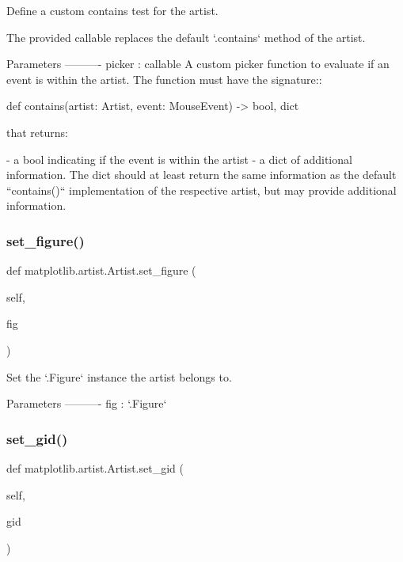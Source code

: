 \begin{DoxyVerb}Define a custom contains test for the artist.

The provided callable replaces the default `.contains` method
of the artist.

Parameters
----------
picker : callable
    A custom picker function to evaluate if an event is within the
    artist. The function must have the signature::

def contains(artist: Artist, event: MouseEvent) -> bool, dict

    that returns:

    - a bool indicating if the event is within the artist
    - a dict of additional information. The dict should at least
      return the same information as the default ``contains()``
      implementation of the respective artist, but may provide
      additional information.
\end{DoxyVerb}
 \mbox{\label{classmatplotlib_1_1artist_1_1Artist_aadfe4032643c1684c4091a2fbca2f02b}} 
\subsubsection{\texorpdfstring{set\+\_\+figure()}{set\_figure()}}
{\footnotesize\ttfamily def matplotlib.\+artist.\+Artist.\+set\+\_\+figure (\begin{DoxyParamCaption}\item[{}]{self,  }\item[{}]{fig }\end{DoxyParamCaption})}

\begin{DoxyVerb}Set the `.Figure` instance the artist belongs to.

Parameters
----------
fig : `.Figure`
\end{DoxyVerb}
 \mbox{\label{classmatplotlib_1_1artist_1_1Artist_aa9f9956c2e5ed3fb357779b7cd66898f}} 
\subsubsection{\texorpdfstring{set\+\_\+gid()}{set\_gid()}}
{\footnotesize\ttfamily def matplotlib.\+artist.\+Artist.\+set\+\_\+gid (\begin{DoxyParamCaption}\item[{}]{self,  }\item[{}]{gid }\end{DoxyParamCaption})}

